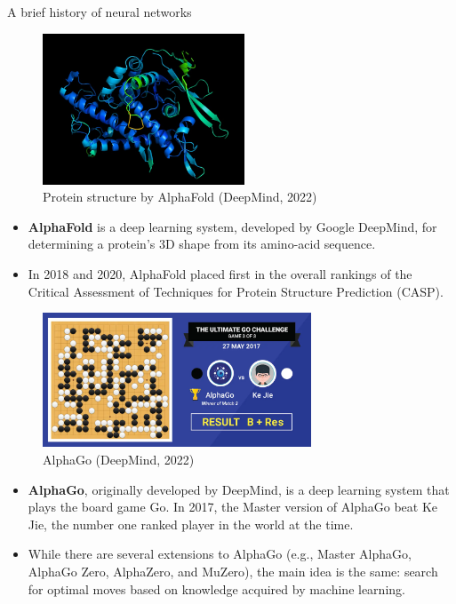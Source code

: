 \begin{vbframe}{A brief history of neural networks}
\begin{figure}
\centering
\includegraphics[width=6cm]{figure/alphafold.jpg}
\caption{Protein structure by AlphaFold (DeepMind, 2022)}
\end{figure}
\footnotesize
\begin{itemize}
\item\textbf{AlphaFold} is a deep learning system, developed by Google DeepMind, for determining a protein's 3D shape from its amino-acid sequence.
\vspace{.1cm}
\item In 2018 and 2020, AlphaFold placed first in the overall rankings of the Critical Assessment of Techniques for Protein Structure Prediction (CASP).
\end{itemize}
\framebreak
\begin{figure}
\centering
\includegraphics[width=8cm]{figure/alphago.png}
\caption{AlphaGo (DeepMind, 2022)}
\end{figure}
\footnotesize
\begin{itemize}
\item\textbf{AlphaGo}, originally developed by DeepMind, is a deep learning system that plays the board game Go. In 2017, the Master version of AlphaGo beat Ke Jie, the number one ranked player in the world at the time.
\vspace{.1cm}
\item While there are several extensions to AlphaGo (e.g., Master AlphaGo, AlphaGo Zero, AlphaZero, and MuZero), the main idea is the same: search for optimal moves based on knowledge acquired by machine learning.
\end{itemize}
\framebreak


\end{vbframe}
